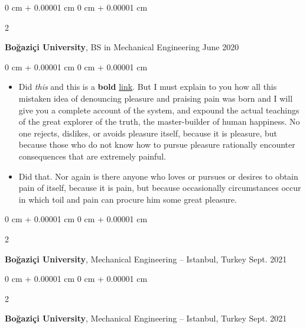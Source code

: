 \documentclass[10pt, letterpaper]{article}
\newenvironment{highlights}{
    \begin{itemize}[
        topsep=0.10 cm,
        parsep=0.10 cm,
        partopsep=0pt,
        itemsep=0pt,
        leftmargin=0 cm + 10pt
    ]
}{
    \end{itemize}
} %
\newenvironment{onecolentry}{
    \begin{adjustwidth}{
        0 cm + 0.00001 cm
    }{
        0 cm + 0.00001 cm
    }
}{
    \end{adjustwidth}
} %
\newenvironment{twocolentry}[2][]{
    \onecolentry
    \def\secondColumn{#2}
    \setcolumnwidth{\fill, 4.5 cm}
    \begin{paracol}{2}
}{
    \switchcolumn \raggedleft \secondColumn
    \end{paracol}
    \endonecolentry
} %
\begin{document}
        \vspace{0.2 cm}

        \begin{twocolentry}{
            June 2020
        }
            \textbf{Boğaziçi University}, BS in Mechanical Engineering\end{twocolentry}

        \vspace{0.10 cm}
        \begin{onecolentry}
            \begin{highlights}
                \item Did \textit{this} and this is a \textbf{bold} \href{https://example.com}{link}. But I must explain to you how all this mistaken idea of denouncing pleasure and praising pain was born and I will give you a complete account of the system, and expound the actual teachings of the great explorer of the truth, the master-builder of human happiness. No one rejects, dislikes, or avoids pleasure itself, because it is pleasure, but because those who do not know how to pursue pleasure rationally encounter consequences that are extremely painful.
                \item Did that. Nor again is there anyone who loves or pursues or desires to obtain pain of itself, because it is pain, but because occasionally circumstances occur in which toil and pain can procure him some great pleasure.
            \end{highlights}
        \end{onecolentry}


        \vspace{0.2 cm}

        \begin{twocolentry}{
            Sept. 2021
        }
            \textbf{Boğaziçi University}, Mechanical Engineering -- Istanbul, Turkey\end{twocolentry}



        \vspace{0.2 cm}

        \begin{twocolentry}{
            Sept. 2021
        }
            \textbf{Boğaziçi University}, Mechanical Engineering -- Istanbul, Turkey\end{twocolentry}



        \vspace{0.2 cm}
\end{document}
